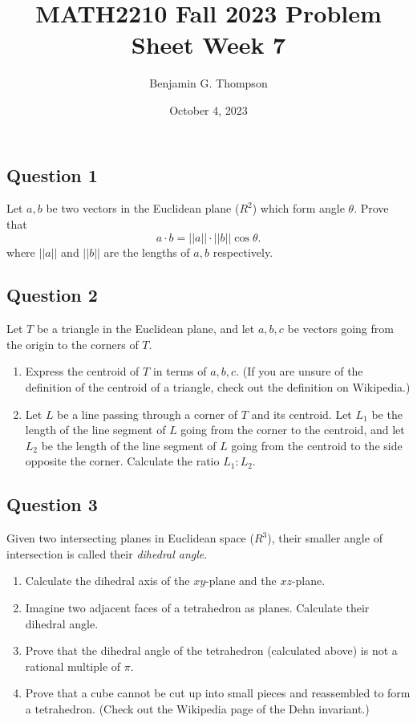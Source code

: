\documentclass[12pt, a4paper]{article}
\title{MATH2210 Fall 2023 Problem Sheet Week 7}
\author{Benjamin G. Thompson}
\date{October 4, 2023}
\begin{document}
\subsection*{Question 1}
Let $a,b$ be two vectors in the Euclidean plane ($R^2$) which form angle $\theta$. Prove that
\[
a \cdot b = ||a|| \cdot ||b|| \cos \theta.
\]
where $||a||$ and $||b||$ are the lengths of $a,b$ respectively.

\subsection*{Question 2}
Let $T$ be a triangle in the Euclidean plane, and let $a,b,c$ be vectors going from the origin to the corners of $T$.
\begin{enumerate}
\item Express the centroid of $T$ in terms of $a,b,c$. (If you are unsure of the definition of the centroid of a triangle, check out the definition on Wikipedia.)
\item Let $L$ be a line passing through a corner of $T$ and its centroid. Let $L_1$ be the length of the line segment of $L$ going from the corner to the centroid, and let $L_2$ be the length of the line segment of $L$ going from the centroid to the side opposite the corner. Calculate the ratio $L_1:L_2$.
\end{enumerate}

\subsection*{Question 3}
Given two intersecting planes in Euclidean space ($R^3$), their smaller angle of intersection is called their \emph{dihedral angle}.
\begin{enumerate}
\item Calculate the dihedral axis of the $xy$-plane and the $xz$-plane.
\item Imagine two adjacent faces of a tetrahedron as planes. Calculate their dihedral angle.
\item Prove that the dihedral angle of the tetrahedron (calculated above) is not a rational multiple of $\pi$.
\item Prove that a cube cannot be cut up into small pieces and reassembled to form a tetrahedron. (Check out the Wikipedia page of the Dehn invariant.)
\end{enumerate}
\end{document}
